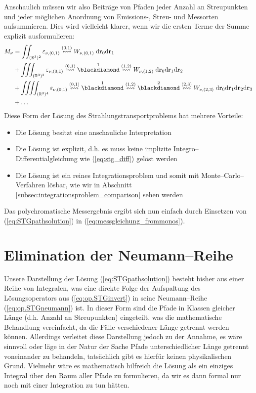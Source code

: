 	Anschaulich müssen wir also Beiträge von Pfaden jeder Anzahl an Streupunkten und jeder möglichen Anordnung von Emissions-, Streu- und Mess\-orten aufsummieren. Dies wird vielleicht klarer, wenn wir die ersten Terme der Summe explizit ausformulieren:
	\begin{align*}
		M_\nu&=\iint_{(\mathbb{R}^3)^2}\varepsilon_{\nu,(0,1)}\propagate{0}{1} W_{\nu,(0,1)} \;\text{d}\location{r}_0\text{d}\location{r}_1 \\
		&+\iiint_{(\mathbb{R}^3)^3}\varepsilon_{\nu,(0,1)}\propagate{0}{1}\scatter{1}\propagate{1}{2} W_{\nu,(1,2)} \;\text{d}\location{r}_0\text{d}\location{r}_1\text{d}\location{r}_2 \\
		&+\iiiint_{(\mathbb{R}^3)^4}\varepsilon_{\nu,(0,1)}\propagate{0}{1}\scatter{1}\propagate{1}{2}\scatter{2}\propagate{2}{3} W_{\nu,(2,3)} \;\text{d}\location{r}_0\text{d}\location{r}_1\text{d}\location{r}_2\text{d}\location{r}_3 \\
		&+\hdots
	\end{align*}
	Diese Form der Lösung des Strahlungstransportproblems hat mehrere Vorteile:
	\begin{itemize}
		\item{Die Lösung besitzt eine anschauliche Interpretation}
		\item{Die Lösung ist explizit, d.h. es muss keine implizite In\-te\-gro--Dif\-fer\-en\-ti\-al\-glei\-chung wie (\ref{eq:stg_diff}) gelöst werden}
		\item{Die Lösung ist ein reines Integrationsproblem und somit mit Monte--Carlo--Verfahren lösbar, wie wir in Abschnitt \ref{subsec:integrationsproblem_comparison} sehen werden}
	\end{itemize}
	Das polychromatische Messergebnis ergibt sich nun einfach durch Einsetzen von (\ref{eq:STGpathsolution}) in (\ref{eq:messgleichung_frommonos}).


	\section{Elimination der Neumann--Reihe}\label{sec:neumann_elimination}
	Unsere Darstellung der Lösung (\ref{eq:STGpathsolution}) besteht bisher aus einer Reihe von Integralen, was eine direkte Folge der Aufspaltung des Lösungsoperators aus (\ref{eq:op.STGinvert}) in seine Neumann--Reihe (\ref{eq:op.STGneumann}) ist. In dieser Form sind die Pfade in Klassen gleicher Länge (d.h. Anzahl an Streupunkten) eingeteilt, was die mathematische Behandlung vereinfacht, da die Fälle verschiedener Länge getrennt werden können. Allerdings verleitet diese Darstellung jedoch zu der Annahme, es wäre sinnvoll oder läge in der Natur der Sache Pfade unterschiedlicher Länge getrennt voneinander zu behandeln, tatsächlich gibt es hierfür keinen physikalischen Grund. Vielmehr wäre es mathematisch hilfreich die Lösung als ein einziges Integral über den Raum aller Pfade zu formulieren, da wir es dann formal nur noch mit einer Integration zu tun hätten.
	
